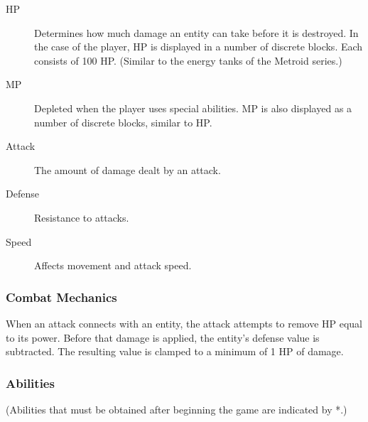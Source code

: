 \documentclass{article}
\begin{document}
\begin{description}

\item[HP]
Determines how much damage an entity can take before it is destroyed.  In the case of the player, HP is displayed in a number of discrete blocks.  Each consists of 100 HP.  (Similar to the energy tanks of the Metroid series.)

\item[MP]
Depleted when the player uses special abilities.  MP is also displayed as a number of discrete blocks, similar to HP.

\item[Attack]
The amount of damage dealt by an attack.

\item[Defense]
Resistance to attacks.

\item[Speed]
Affects movement and attack speed.

\end{description}

\label{CombatMechanics}
\subsubsection{Combat Mechanics}

When an attack connects with an entity, the attack attempts to remove HP equal to its power.  Before that damage is applied, the entity's defense value is subtracted.  The resulting value is clamped to a minimum of 1 HP of damage.

\label{AbilitiesSection}
\subsubsection{Abilities}
(Abilities that must be obtained after beginning the game are indicated by *.)
\end{document}
